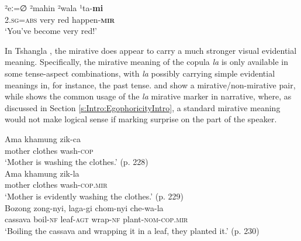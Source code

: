\begin{exe}
        \ex\label{e:Description:TamangMirative}
        \gll ²eː=∅ ²mahin ²wala ¹ta-\textbf{mi} \\
        \textsc{2.sg=abs} very red happen-\textbf{\textsc{mir}} \\
        \glt `You've become very red!' \cite[115]{OwenSmith2014}
\end{exe}

In Tshangla \cite[Internal isolate: Bhutan,][228]{Andvik2010}, the mirative does appear to carry a much stronger visual evidential meaning. Specifically, the mirative meaning of the copula \textit{la} is only available in some tense-aspect combinations, with \textit{la} possibly carrying simple evidential meanings in, for instance, the past tense.  and  show a mirative/non-mirative pair, while  shows the common usage of the \textit{la} mirative marker in narrative, where, as discussed in Section \ref{s:Intro:EgophoricityIntro}, a standard mirative meaning would not make logical sense if marking surprise on the part of the speaker.

\begin{exe}
        \ex
        \begin{xlist}
                \ex\label{e:Description:TshanglaPresNonMir}
                \gll Ama khamung zik-ca \\
                mother clothes wash-\textsc{cop} \\
                \glt `Mother is washing the clothes.' (p. 228) \\
                \ex\label{e:Description:TshanglaPresMir}
                \gll Ama khamung zik-la \\
                mother clothes wash-\textsc{cop.mir} \\
                \glt `Mother is evidently washing the clothes.' (p. 229) \\
                \ex\label{e:Description:TshanglaNarrativeNonMir}
                \gll Bozong zong-nyi, laga-gi chom-nyi che-wa-la \\
                cassava boil-\textsc{nf} leaf-\textsc{agt} wrap-\textsc{nf} plant-\textsc{nom}-\textsc{cop.mir} \\
                \glt `Boiling the cassava and wrapping it in a leaf, they planted it.' (p. 230)
        \end{xlist}
        \cite[Tshangla,][]{Andvik2010}
\end{exe}

